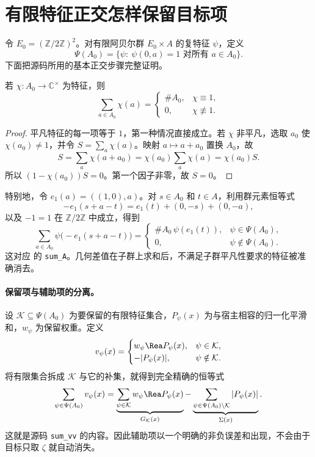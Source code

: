 \section{有限特征正交怎样保留目标项}
\label{sec:arith-orthogonality}
令 $E_0=(\mathbb Z/2\mathbb Z)^2$。对有限阿贝尔群 $E_0\times A$ 的复特征 $\psi$，定义
\[
\Psi(A_0)=\{\psi:\ \psi(0,a)=1\text{ 对所有 }a\in A_0\}.
\]
下面把源码所用的基本正交步骤完整证明。

\begin{lemma}[子群上的有限特征和]
若 $\chi:A_0\to\mathbb C^\times$ 为特征，则
\[
\sum_{a\in A_0}\chi(a)=
\begin{cases}
\#A_0,&\chi\equiv1,\\
0,&\chi\not\equiv1.
\end{cases}
\]
\end{lemma}
\begin{proof}
平凡特征的每一项等于 $1$，第一种情况直接成立。若 $\chi$ 非平凡，选取 $a_0$ 使 $\chi(a_0)\ne1$，并令 $S=\sum_a\chi(a)$。映射 $a\mapsto a+a_0$ 置换 $A_0$，故
\[
S=\sum_a\chi(a+a_0)=\chi(a_0)\sum_a\chi(a)=\chi(a_0)S.
\]
所以 $(1-\chi(a_0))S=0$。第一个因子非零，故 $S=0$。
\end{proof}

特别地，令 $e_1(a)=((1,0),a)$。对 $s\in A_0$ 和 $t\in A$，利用群元素恒等式
\[
-e_1(s+a-t)=e_1(t)+(0,-s)+(0,-a),
\]
以及 $-1=1$ 在 $\mathbb Z/2\mathbb Z$ 中成立，得到
\begin{equation}
\sum_{a\in A_0}\psi\bigl(-e_1(s+a-t)\bigr)
=
\begin{cases}
\#A_0\,\psi(e_1(t)),&\psi\in\Psi(A_0),\\
0,&\psi\notin\Psi(A_0).
\end{cases}
\label{eq:arith-character-projection}
\end{equation}
这对应  的 \texttt{sum\_A}。几何差值在子群上求和后，不满足子群平凡性要求的特征被准确消去。

\paragraph{保留项与辅助项的分离。}
设 $\mathcal K\subseteq\Psi(A_0)$ 为要保留的有限特征集合，$P_\psi(x)$ 为与宿主相容的归一化平滑和，$w_\psi$ 为保留权重。定义
\[
v_\psi(x)=
\begin{cases}
w_\psi\Rea P_\psi(x),&\psi\in\mathcal K,\\
-|P_\psi(x)|,&\psi\notin\mathcal K.
\end{cases}
\]
将有限集合拆成 $\mathcal K$ 与它的补集，就得到完全精确的恒等式
\begin{equation}
\sum_{\psi\in\Psi(A_0)}v_\psi(x)
=\underbrace{\sum_{\psi\in\mathcal K}w_\psi\Rea P_\psi(x)}_{G_{\mathcal K}(x)}
-\underbrace{\sum_{\psi\in\Psi(A_0)\setminus\mathcal K}|P_\psi(x)|}_{\Sigma(x)}.
\label{eq:arith-g-minus-sigma}
\end{equation}
这就是源码 \texttt{sum\_vv} 的内容。因此辅助项以一个明确的非负误差和出现，不会由于目标只取 $\zeta$ 就自动消失。

